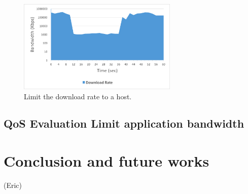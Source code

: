 \documentclass[journal]{IEEEtran}
\begin{document}
\begin{figure}[!t]
\centering
\includegraphics[width=3in]{./figures/qos_limit_host}
\caption{Limit the download rate to a host.}
\label{fig:qos_limit_host}
\end{figure}

\subsection{QoS Evaluation Limit application bandwidth}




\section{Conclusion and future works}
(Eric)



\newpage


\end{document}

